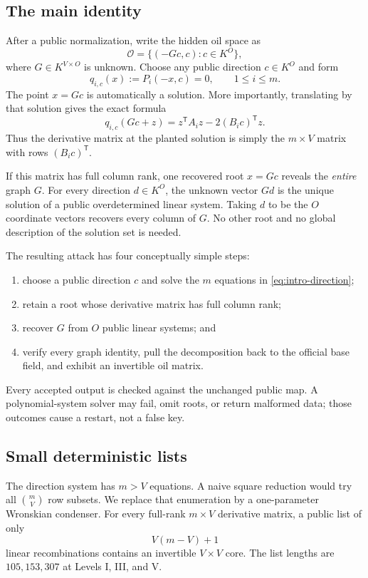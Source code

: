 \documentclass[11pt,a4paper]{article}
\theoremstyle{definition}
\theoremstyle{remark}
\newcommand{\cO}{\mathcal O}
\begin{document}
\subsection*{The main identity}
After a public normalization, write the hidden oil space as
\begin{equation}\label{eq:intro-graph}
 \cO=\{(-Gc,c):c\in K^O\},
\end{equation}
where $G\in K^{V\times O}$ is unknown.  Choose any public direction $c\in K^O$ and form
\begin{equation}\label{eq:intro-direction}
 q_{i,c}(x):=P_i(-x,c)=0,
 \qquad 1\le i\le m.
\end{equation}
The point $x=Gc$ is automatically a solution.  More importantly, translating by that solution gives the exact formula
\begin{equation}\label{eq:intro-translation}
 q_{i,c}(Gc+z)=z^{\mathsf T}A_i z-2(B_i c)^{\mathsf T}z.
\end{equation}
Thus the derivative matrix at the planted solution is simply the $m\times V$ matrix with rows $(B_i c)^{\mathsf T}$.

If this matrix has full column rank, one recovered root $x=Gc$ reveals the \emph{entire} graph $G$.  For every direction $d\in K^O$, the unknown vector $Gd$ is the unique solution of a public overdetermined linear system.  Taking $d$ to be the $O$ coordinate vectors recovers every column of $G$.  No other root and no global description of the solution set is needed.

The resulting attack has four conceptually simple steps:
\begin{enumerate}
\item choose a public direction $c$ and solve the $m$ equations in \eqref{eq:intro-direction};
\item retain a root whose derivative matrix has full column rank;
\item recover $G$ from $O$ public linear systems; and
\item verify every graph identity, pull the decomposition back to the official base field, and exhibit an invertible oil matrix.
\end{enumerate}
Every accepted output is checked against the unchanged public map.  A polynomial-system solver may fail, omit roots, or return malformed data; those outcomes cause a restart, not a false key.

\subsection*{Small deterministic lists}
The direction system has $m>V$ equations.  A naive square reduction would try all $\binom mV$ row subsets.  We replace that enumeration by a one-parameter Wronskian condenser.  For every full-rank $m\times V$ derivative matrix, a public list of only
\[
V(m-V)+1
\]
linear recombinations contains an invertible $V\times V$ core.  The list lengths are $105,153,307$ at Levels I, III, and V.
\end{document}
